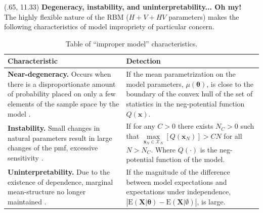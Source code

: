 \documentclass[extrafontsizes, 30pt]{memoir}
\begin{document}
\begin{textblock}{14}(.65, 11.33)
{\large \bfseries Degeneracy, instability, and uninterpretability... Oh my!}\\[-1cm]

The highly flexible nature of the RBM ($H + V + HV$ parameters) makes the following characteristics of model impropriety of particular concern. \\[-.5cm]

\begin{table}
\centering
\begin{tabular}{| p{.48\linewidth} | p{.5\linewidth} |}
\hline
Characteristic & Detection \\
\hline
\hline
{\bfseries Near-degeneracy.} Occurs when there is a disproportionate amount of probability placed on only a few elements of the sample space by the model \cite{handcock2003assessing}. & If the mean parametrization on the model parameters, $\mu(\boldsymbol \theta)$, is close to the boundary of the convex hull of the set of statistics in the neg-potential function $Q(\boldsymbol x)$. \\
\hline
{\bfseries Instability.} Small changes in natural parameters result in large changes of the pmf, excessive sensitivity \cite{schweinberger2011instability}. & If for any $C > 0$ there exists $N_C > 0$ such that 
$\max\limits_{\boldsymbol x_N \in \mathcal{X}_N}[Q(\boldsymbol x_N)] > CN$ for all $N > N_C$. Where $Q(\cdot)$ is the neg-potential function of the model. \\
\hline
{\bfseries Uninterpretability.} Due to the existence of dependence, marginal mean-structure no longer maintained \cite{kaiser2007statistical}. & If the magnitude of the difference between model expectations and expectations under independence, $\left|\text{E}(\boldsymbol X | \boldsymbol \theta) - \text{E}(\boldsymbol X | \emptyset ) \right|$, is large.\\
\hline
\end{tabular}
\label{tab:degen}
\caption{Table of ``improper model'' characteristics.}
\end{table}
\end{textblock}
\end{document}

